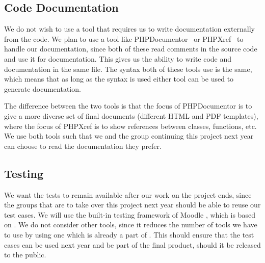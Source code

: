 \subsection{Code Documentation}
\label{xref}
We do not wish to use a tool that requires us to write documentation externally from the code.
We plan to use a tool like PHPDocumentor~\cite{phpdocumentor} or PHPXref~\cite{phpxref} to handle our documentation, since both of these read comments in the source code and use it for documentation.
This gives us the ability to write code and documentation in the same file.
The syntax both of these tools use is the same, which means that as long as the syntax is used either tool can be used to generate documentation.

The difference between the two tools is that the focus of PHPDocumentor is to give a more diverse set of final documents (different HTML and PDF templates), where the focus of PHPXref is to show references between classes, functions, etc.
We use both tools such that we and the group continuing this project next year can choose to read the documentation they prefer.


\subsection{Testing}
\label{sub:testing}
We want the tests to remain available after our work on the project ends, since the groups that are to take over this project next year should be able to reuse our test cases.
We will use the built-in testing framework of Moodle \cite{moodletest}, which is based on \simpletest{} \cite{simpletest}.
We do not consider other tools, since it reduces the number of tools we have to use by using one which is already a part of \moodle{}.
This should ensure that the test cases can be used next year and be part of the final product, should it be released to the public.